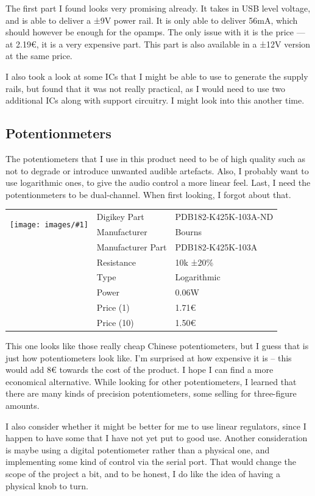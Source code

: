 \documentclass[a4paper]{article}
\makeatletter
\newenvironment{partdisplay}[1]{
\begin{center}
\begin{tabular}{@{}p{3cm}p{3cm}p{4.5cm}@{}}
\multirow{2}{3cm}{\texttt{[image: images/\#1]}}}{
\end{tabular}
\end{center}}
\makeatother
\begin{document}
The first part I found looks very promising already. It takes in USB level voltage, and is able to deliver a ±9V power rail. It is only able to deliver 56mA, which should however be enough for the opamps. The only issue with it is the price — at 2.19€, it is a very expensive part. This part is also available in a ±12V version at the same price.

I also took a look at some ICs that I might be able to use to generate the supply rails, but found that it was not really practical, as I would need to use two additional ICs along with support circuitry. I might look into this another time.

\subsection{Potentionmeters}

The potentiometers that I use in this product need to be of high quality such as not to degrade or introduce unwanted audible artefacts. Also, I probably want to use logarithmic ones, to give the audio control a more linear feel. Last, I need the potentionmeters to be dual-channel. When first looking, I forgot about that.

\begin{partdisplay}{PDB182}
& Digikey Part & PDB182-K425K-103A-ND\\
& Manufacturer & Bourns\\
& Manufacturer Part & PDB182-K425K-103A\\
& Resistance & 10k ±20\%\\
& Type & Logarithmic\\
& Power & 0.06W\\
& Price (1) & 1.71€\\
& Price (10) & 1.50€\\
\end{partdisplay}

This one looks like those really cheap Chinese potentiometers, but I guess that is just how potentiometers look like. I'm surprised at how expensive it is -- this would add 8€ towards the cost of the product. I hope I can find a more economical alternative. While looking for other potentiometers, I learned that there are many kinds of precision potentiometers, some selling for three-figure amounts.

I also consider whether it might be better for me to use linear regulators, since I happen to have some that I have not yet put to good use. Another consideration is maybe using a digital potentiometer rather than a physical one, and implementing some kind of control via the serial port. That would change the scope of the project a bit, and to be honest, I do like the idea of having a physical knob to turn. 
\end{document}
